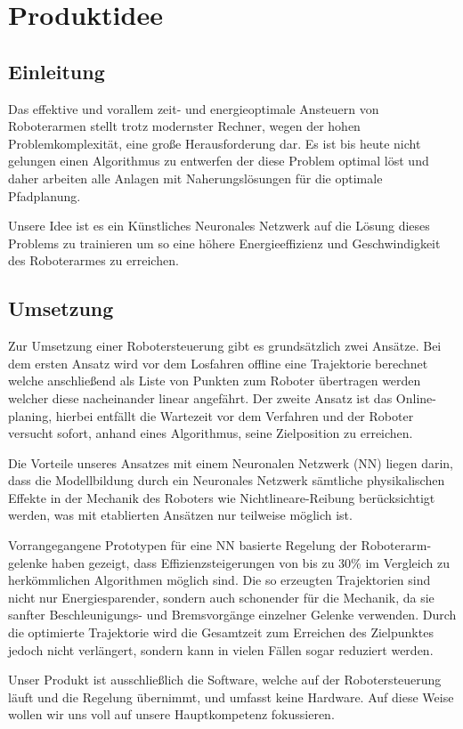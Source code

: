 \chapter{Produktidee}

\section{Einleitung}

Das effektive und vorallem zeit- und energieoptimale Ansteuern von Roboterarmen stellt trotz modernster Rechner, wegen der hohen Problemkomplexität, eine große Herausforderung dar. Es ist bis heute nicht gelungen einen Algorithmus zu entwerfen der diese Problem optimal löst und daher arbeiten alle Anlagen mit Naherungslösungen für die optimale Pfadplanung.

Unsere Idee ist es ein Künstliches Neuronales Netzwerk auf die Lösung dieses Problems zu trainieren um so eine höhere Energieeffizienz und Geschwindigkeit des Roboterarmes zu erreichen.

\section{Umsetzung}

Zur Umsetzung einer Robotersteuerung gibt es grundsätzlich zwei Ansätze. Bei dem ersten Ansatz wird vor dem Losfahren offline eine Trajektorie berechnet welche anschließend als Liste von Punkten zum Roboter übertragen werden welcher diese nacheinander linear angefährt. Der zweite Ansatz ist das Online-planing, hierbei entfällt die Wartezeit vor dem Verfahren und der Roboter versucht sofort, anhand eines Algorithmus, seine Zielposition zu erreichen. 

Die Vorteile unseres Ansatzes mit einem Neuronalen Netzwerk (NN) liegen darin, dass die Modellbildung durch ein Neuronales Netzwerk sämtliche physikalischen Effekte in der Mechanik des Roboters wie Nichtlineare-Reibung berücksichtigt werden, was mit etablierten Ansätzen nur teilweise möglich ist.

Vorrangegangene Prototypen für eine NN basierte Regelung der Roboterarm-gelenke haben gezeigt, dass Effizienzsteigerungen von bis zu 30\% im Vergleich zu herkömmlichen Algorithmen möglich sind. Die so erzeugten Trajektorien sind nicht nur Energiesparender, sondern auch schonender für die Mechanik, da sie sanfter Beschleunigungs- und Bremsvorgänge  einzelner Gelenke verwenden. Durch die optimierte Trajektorie wird die Gesamtzeit zum Erreichen des Zielpunktes jedoch nicht verlängert, sondern kann in vielen Fällen sogar reduziert werden.

Unser Produkt ist ausschließlich die Software, welche auf der Robotersteuerung läuft und die Regelung übernimmt, und umfasst keine Hardware. Auf diese Weise wollen wir uns voll auf unsere Hauptkompetenz fokussieren.

